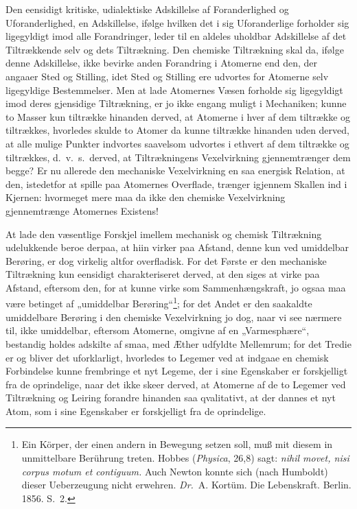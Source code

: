 \documentclass[12pt,a4paper]{book}
\begin{document}
Den eensidigt kritiske, udialektiske Adskillelse af
Foranderlighed og Uforanderlighed, en Adskillelse, ifølge hvilken det i
sig Uforanderlige forholder sig ligegyldigt imod alle
Forandringer, leder til en aldeles uholdbar Adskillelse af det
Tiltrækkende selv og dets Tiltrækning. Den chemiske
Tiltrækning skal da, ifølge denne Adskillelse, ikke bevirke anden
Forandring i Atomerne end den, der angaaer Sted og Stilling,
idet Sted og Stilling ere udvortes for Atomerne selv
ligegyldige Bestemmelser. Men at lade Atomernes Væsen
\setcounter{footnote}{0}
forholde sig ligegyldigt imod deres gjensidige Tiltrækning, er
jo ikke engang muligt i Mechaniken; kunne to Masser kun
tiltrække hinanden derved, at Atomerne i hver af dem
tiltrække og tiltrækkes, hvorledes skulde to Atomer da kunne
tiltrække hinanden uden derved, at alle mulige Punkter
indvortes saavelsom udvortes i ethvert af dem tiltrække og
tiltrækkes, d.~v.~s.\ derved, at Tiltrækningens Vexelvirkning
gjennemtrænger dem begge? Er nu allerede den mechaniske
Vexelvirkning en saa energisk Relation, at den, istedetfor at spille
paa Atomernes Overflade, trænger igjennem Skallen ind i
Kjernen: hvormeget mere maa da ikke den chemiske
Vexelvirkning gjennemtrænge Atomernes Existens!

At lade den væsentlige Forskjel imellem mechanisk og
chemisk Tiltrækning udelukkende beroe derpaa, at hiin virker
paa Afstand, denne kun ved umiddelbar Berøring, er dog
virkelig altfor overfladisk. For det Første er den mechaniske
Tiltrækning kun eensidigt charakteriseret derved, at den siges
at virke paa Afstand, eftersom den, for at kunne virke som
Sammenhængskraft, jo ogsaa maa være betinget af „umiddelbar
Berøring“\footnote{Ein Körper, der einen andern in Bewegung
setzen soll, muß mit diesem in unmittelbare Berührung treten.
Hobbes (\textit{Physica}, 26,8) sagt: \textit{nihil movet, nisi
corpus motum et contiguum.} Auch Newton konnte sich (nach
Humboldt) dieser Ueberzeugung nicht erwehren. \textit{Dr.}\
A. Kortüm. Die Lebenskraft. Berlin. 1856. S.~2.
};
for det Andet er den saakaldte umiddelbare
Berøring i den chemiske Vexelvirkning jo dog, naar
vi see nærmere til, ikke umiddelbar, eftersom Atomerne,
omgivne af en „Varmesphære“, bestandig holdes adskilte af
smaa, med Æther udfyldte Mellemrum; for det Tredie er og
bliver det uforklarligt, hvorledes to Legemer ved at indgaae
en chemisk Forbindelse kunne frembringe et nyt Legeme, der
i sine Egenskaber er forskjelligt fra de oprindelige, naar det
ikke skeer derved, at Atomerne af de to Legemer ved
Tiltrækning og Leiring forandre hinanden saa qvalitativt, at der
dannes et nyt Atom, som i sine Egenskaber er forskjelligt fra
de oprindelige.
\end{document}
